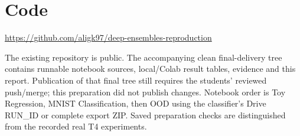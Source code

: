 \documentclass[11pt,a4paper]{article}
\begin{document}
\section*{Code}
\url{https://github.com/aligk97/deep-ensembles-reproduction}

The existing repository is public. The accompanying clean final-delivery tree contains runnable notebook sources, local/Colab result tables, evidence and this report. Publication of that final tree still requires the students' reviewed push/merge; this preparation did not publish changes. Notebook order is Toy Regression, MNIST Classification, then OOD using the classifier's Drive RUN\_ID or complete export ZIP. Saved preparation checks are distinguished from the recorded real T4 experiments.



\end{document}
